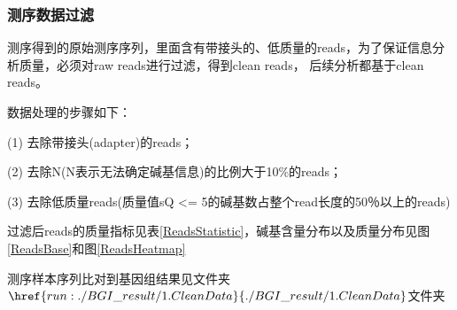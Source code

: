 \documentclass[10pt, oneside,a4paper]{article}
\begin{document}
\subsubsection{测序数据过滤}
测序得到的原始测序序列，里面含有带接头的、低质量的reads，为了保证信息分析质量，必须对raw reads进行过滤，得到clean reads，
后续分析都基于clean reads。\par
数据处理的步骤如下：\par
(1) 去除带接头(adapter)的reads；\par
(2) 去除N(N表示无法确定碱基信息)的比例大于10\%的reads；\par
(3) 去除低质量reads(质量值sQ <= 5的碱基数占整个read长度的50％以上的reads)\par
过滤后reads的质量指标见表\ref{ReadsStatistic}，碱基含量分布以及质量分布见图\ref{ReadsBase}和图\ref{ReadsHeatmap}\par
测序样本序列比对到基因组结果见文件夹$\href{run:./BGI\_result/1.CleanData}{./BGI\_result/1.CleanData}$文件夹\par
\vspace{5 mm}
\end{document}
